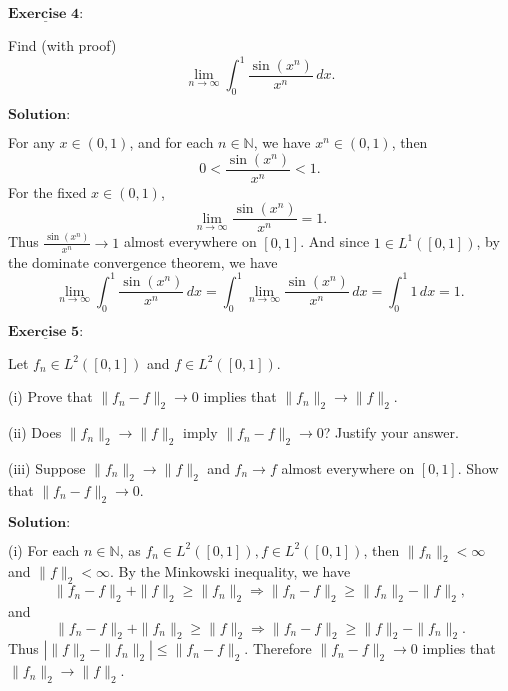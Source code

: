 \documentclass[12pt,a4paper]{ctexart}
\begin{document}
\newpage 

$\underline{\textbf{Exercise 4:}}$ 

Find (with proof)
\begin{equation*}
    \lim_{n \to \infty} \int_{0}^{1} \frac{\sin (x^n)}{x^n} \, d x.
\end{equation*}

\vspace{8pt}
$\textbf{Solution:}$

For any $x \in (0,1)$, and for each $n \in \mathbb N$, we have $x^n \in (0,1)$, then
$$0 < \frac{\sin (x^n)}{x^n} < 1.$$
For the fixed $x \in (0,1)$,
$$\lim_{n \to \infty} \frac{\sin (x^n)}{x^n} = 1.$$
Thus $\frac{\sin (x^n)}{x^n} \to 1$ almost everywhere on $[0,1]$. And since $1 \in L^1([0,1])$, by the dominate convergence theorem, we have
\begin{equation*}
    \lim_{n \to \infty} \int_{0}^{1} \frac{\sin (x^n)}{x^n} \, d x = \int_{0}^{1} \lim_{n \to \infty} \frac{\sin (x^n)}{x^n} \, d x = \int_{0}^{1} 1 \, d x = 1.
\end{equation*}


\newpage 

$\underline{\textbf{Exercise 5:}}$

Let $f_n \in L^2([0,1])$ and $f \in L^2([0,1])$.

(i) Prove that $\|f_n - f \|_2 \to 0$ implies that $\|f_n\|_2 \to \|f\|_2$.

(ii) Does $\|f_n\|_2 \to \|f\|_2$ imply $\|f_n - f\|_2 \to 0$? Justify your answer.

(iii) Suppose $\|f_n\|_2 \to \|f\|_2$ and $f_n \to f$ almost everywhere on $[0,1]$. Show that $\|f_n -f \|_2 \to 0$.

\vspace{8pt}
$\textbf{Solution:}$

(i) For each $n \in \mathbb N$, as $f_n \in L^2([0,1]), f \in L^2([0,1])$, then $\|f_n\|_2 < \infty$ and $\|f\|_2 < \infty$. By the Minkowski inequality, we have
\begin{equation*}
    \|f_n - f\|_2 + \|f\|_2 \geq \|f_n\|_2 \Rightarrow \|f_n - f\|_2 \geq  \|f_n\|_2 - \|f\|_2,
\end{equation*}
and 
\begin{equation*}
    \|f_n - f\|_2 + \|f_n\|_2 \geq \|f\|_2 \Rightarrow \|f_n - f\|_2 \geq  \|f\|_2 - \|f_n\|_2.
\end{equation*}
Thus $|\|f\|_2 - \|f_n\|_2| \leq \|f_n - f\|_2$. Therefore $\|f_n - f \|_2 \to 0$ implies that $\|f_n\|_2 \to \|f\|_2$.
\end{document}
